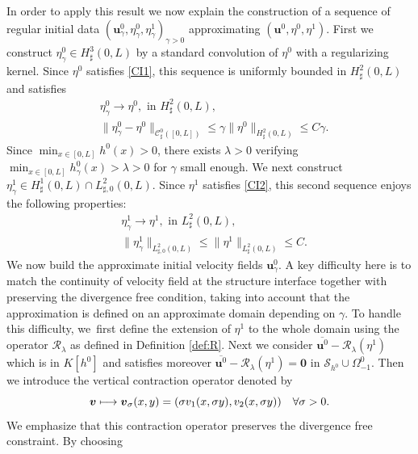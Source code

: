 \documentclass[11pt]{article}
\let\mathcal\mathscr
\newcommand\mto{\mathchoice{\longmapsto}{\mapsto}{\mapsto}{\mapsto}}
\theoremstyle{remark}
\theoremstyle{definition}
\newcommand{\ug}{\boldsymbol{u}}
\newcommand{\vg}{\boldsymbol{v}}
\newcommand{\BS}[1]{\boldsymbol{#1}}
\begin{document}
In order to apply this result we now explain the construction of a sequence of regular initial data $(\ug_\gamma^0,\eta_\gamma^0, \eta_\gamma^1)_{\gamma >0}$ approximating $(\ug^0, \eta^0, \eta^1)$. First we construct \hbox{$\eta^0_\gamma\in H^{3}_{\sharp}(0,L)$} by a standard convolution of $\eta^0$ with a regularizing kernel. Since $\eta^0$ satisfies \eqref{CI1}, this sequence is uniformly bounded in $H^2_\sharp(0,L)$ and satisfies
\begin{align*}
& \eta^0_\gamma\to \eta^0, \text{ in }H^2_\sharp(0,L),\\
& \| \eta^0_\gamma- \eta^0\|_{\mathcal{C}_\sharp^0([0, L])}\leq \gamma \|\eta^0\|_{H^2_\sharp(0, L)}\leq C\gamma.
\end{align*}
Since $\min_{x\in[0, L]}h^0(x)>0$, there exists $\lambda>0$ verifying $\min_{x\in[0, L]}h_\gamma^0(x)>\lambda >0$ for $\gamma$ small enough.
We next construct $\eta^1_\gamma \in H^{1}_{\sharp}(0,L)\cap L^2_{\sharp, 0}(0, L)$.
Since $\eta^1$ satisfies \eqref{CI2}, this second sequence enjoys the following properties:
\begin{align*}
& \eta^1_\gamma\to \eta^1, \text{ in }L^2_\sharp(0,L),\\
& \| \eta^1_\gamma \|_{{L}^2_{\sharp,0}(0, L)}\leq \|\eta^1\|_{L^2_\sharp(0, L)}\leq C.
\end{align*}
We now build the approximate initial velocity fields $\ug^0_{\gamma}$.
A key difficulty here is to match the continuity of velocity field at the structure interface together with preserving the divergence free condition, taking into account
that the approximation is defined on an approximate domain depending on $\gamma$.
To handle this difficulty, we~first define the extension of $\eta^1$ to the whole domain using the operator $\mathcal R_{\lambda}$
as defined in Definition \ref{def:R}. Next we consider $\overline{\ug^0}-\mathcal{R}_\lambda(\eta^1)$ which is in $K[h^0]$ and satisfies moreover $\overline{\ug^{0}}-\mathcal{R}_\lambda(\eta^1)= \BS{0}$ in $\mathcal{S}_{h^0}\cup \Omega_{-1}^0$. Then we introduce the vertical contraction operator denoted by
\[
\vg \mto \vg_\sigma(x, y)=(\sigma v_1(x, \sigma y), v_2(x, \sigma y)) \quad \forall \sigma >0.
\]
We emphasize that this contraction operator preserves the divergence free constraint. By choosing
\end{document}
